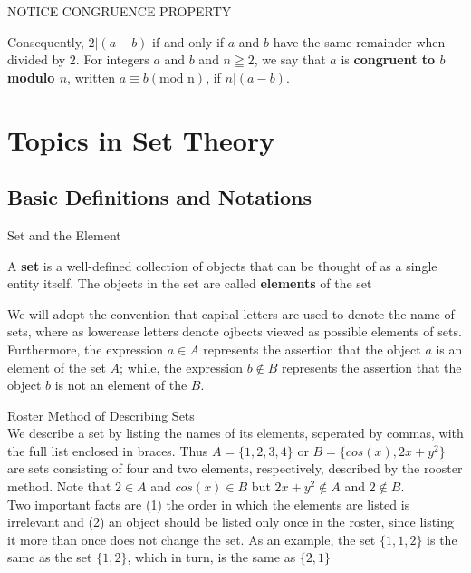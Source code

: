 \begin{example}
\begin{tcolorbox}
NOTICE CONGRUENCE PROPERTY

Consequently, $2 | (a -b)$ if and only if $a$ and $b$ have the same remainder when divided by $2$. For integers $a$ and $b$ and $n \geqq 2$, we say that $a$ is {\bf congruent to $b$ modulo $n$}, written $a \equiv b (\text{mod n})$, if $n | (a - b)$. \\
\end{tcolorbox}


\end{example} 




\newpage
\section{Topics in Set Theory}
\newpage
\subsection{Basic Definitions and Notations}

\begin{definition}
Set and the Element \\

\begin{tcolorbox}
    A {\bf set} is a well-defined collection of objects that can be thought of as a single entity itself. The objects in the set are called {\bf elements} of the set \\
\end{tcolorbox}

We  will adopt the convention that capital letters are used to denote the name of sets, where as lowercase letters denote ojbects viewed as possible elements of sets. Furthermore, the expression $a \in A$ represents the assertion that the object $a$ is an  element of the set $A$; while, the expression $b \notin B$ represents the assertion that the object $b$ is not an element of the $B$. 
\end{definition}

\begin{definition}
Roster Method of Describing Sets \\

We describe a set by listing the names of its elements, seperated by commas, with the full list enclosed in braces. Thus $A = \{1,2,3,4\}$ or $B = \{cos(x), 2x+y^2 \}$ are sets consisting of four and two elements, respectively, described by the rooster method. Note that $2 \in A$ and $cos(x) \in B$ but $2x+y^2 \notin A$ and $2 \notin B$. \\

Two important facts are (1) the order in which the elements are listed is irrelevant and (2) an object should be listed only once in the roster, since listing it more than once does not change the set. As an example, the set $\{1,1,2\}$ is the same as the set $\{1,2\}$, which in turn, is the same as $\{2,1\}$
\end{definition}


